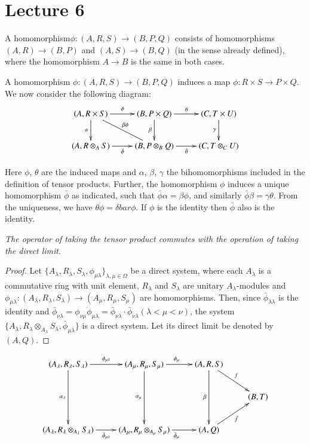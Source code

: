 \chapter{Lecture 6} %

 \begin{defi*}
A homomorphism\pageoriginale $\phi:(A,R,S) \to (B,P,Q)$ consists of
homomorphisms 
$(A,R) \to  (B,P)$ and $(A,S) \to  (B,Q)$ (in the sense already
defined), where  the homomorphism $A \to B$ is the same in both
cases. 
 \end{defi*} 
 
 A homomorphism $\phi : (A,R,S) \to (B,P,Q)$ induces a map $\phi:R
 \times S \to P \times Q$. We now consider the following diagram: 
\[
\xymatrix{
(A,R \times S)\ar[r]^{\phi} \ar[d]_{\alpha}  \ar@{-}[dr]^{\beta\phi} &
  (B,P \times Q) \ar[r]^{\theta} \ar[d]_{\beta}& (C,T\times U)\ar[d]_{\gamma}\\
(A,R\otimes_AS) \ar[r]_{\bar{\phi}} & (B,P\otimes_BQ)
  \ar[r]_{\bar{\theta}} & (C, T \otimes_C U)
}
\]

 Here $\phi$, $\theta$ are the  induced maps and $\alpha$, $\beta$, $\gamma$
 the bihomomorphisms included in the  definition of tensor
 products. Further, the homomorphism $\phi$ induces a unique
 homomorphism $\bar{\phi}$ as indicated, such that $\bar{\phi} \alpha
 = \beta \phi$, and  similarly $\bar{\phi}\beta = \gamma \theta$. From
 the uniqueness, we have $\overline{\theta \phi}= \delta bar{\phi}$. If
 $\phi$ is the identity then $\bar{\phi}$ also is the identity.     
 
 \textit{The operator of taking the tensor product commutes with the 
   operation of taking the direct limit}. 

 \begin{proof}
Let $\{ A_\lambda , R_\lambda, S_\lambda, \phi_{\mu
  \lambda}\}_{\lambda,\mu \in \Omega}$ be a direct system, where each
$A_\lambda$ is a commutative ring with unit element, $R_\lambda$  and
$S_\lambda$ are unitary $A_\lambda$-modules and $\phi_{\mu \lambda}:
(A_\lambda, R_\lambda, S_\lambda) \to (A_\mu, R_\mu, S_\mu)$ are
homomorphisms. Then, since $\bar{\phi}_{\lambda \lambda}$ is the
identity and $\bar{\phi}_{\nu \lambda}= \overline{\phi_{\nu
    \mu}\phi_{\mu \lambda}}= \bar{\phi}_{\nu \lambda} \cdot \bar{\phi}_{\nu
  \lambda}(\lambda < \mu < \nu)$, the system $\{ A_\lambda, R_\lambda
\otimes_{A_\lambda} S_\lambda, \bar{\phi}_{\mu \lambda}\}$ is a direct
system. Let its direct limit be denoted  by $(A,Q)$. 
 \end{proof} 
\[
\xymatrix{
(A_{\lambda}, R_{\lambda}, S_{\lambda}) \ar[r]^{\phi_{\mu\lambda}}
  \ar[dd]_{\alpha_{\lambda}} & (A_{\mu} , R_{\mu}, S_{\mu})
  \ar[r]^{\phi_\mu} \ar[dd]_{\alpha_{\mu}}& (A,R,S) \ar[dd]_{\beta}
  \ar[dr]^f & \\ 
& & & (B,T)\\
(A_{\lambda}, R_{\lambda} \otimes_{A_{\lambda}} S_{\lambda})
  \ar[r]_{\bar{\phi}_{\mu\lambda}} & (A_{\mu} , R_{\mu}
  \otimes_{A_{\mu}} S_{\mu}) \ar[r]_{\bar{\phi}_{\mu}} & (A,Q)
  \ar[ur]_{\bar{f}}  &
}
\]\pageoriginale

